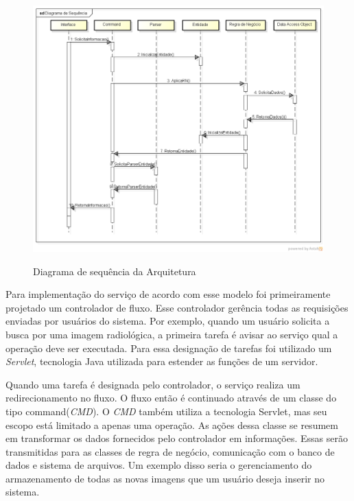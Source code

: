\begin{figure}[ht]
	\centering	
	\caption[\hspace{0.1cm}Diagrama de Sequência.]{Diagrama de sequência da Arquitetura}
	\vspace{-0.4cm}
	\includegraphics[width=1.0\textwidth]{figuras/diagramas/sequencia.png}
	\vspace{-0.2cm}
	\label{fig:figura2}
\end{figure}

Para implementação do serviço de acordo com esse modelo foi primeiramente projetado um controlador de fluxo.
Esse controlador gerência todas as requisições enviadas por usuários do sistema.
Por exemplo, quando um usuário solicita a busca por uma imagem radiológica, a primeira tarefa é avisar ao serviço qual a operação deve ser executada.
Para essa designação de tarefas foi utilizado um \textit{Servlet}, tecnologia Java utilizada para estender as funções de um servidor.

Quando uma tarefa é designada pelo controlador, o serviço realiza um redirecionamento no fluxo.
O fluxo então é continuado através de um classe do tipo command(\textit{CMD}).
O \textit{CMD} também utiliza a tecnologia Servlet, mas seu escopo está limitado a apenas uma operação.
As ações dessa classe se resumem em transformar os dados fornecidos pelo controlador em informações.
Essas serão transmitidas para as classes de regra de negócio, comunicação com o banco de dados e sistema de arquivos.
Um exemplo disso seria o gerenciamento do armazenamento de todas as novas imagens que um usuário deseja inserir no sistema.

